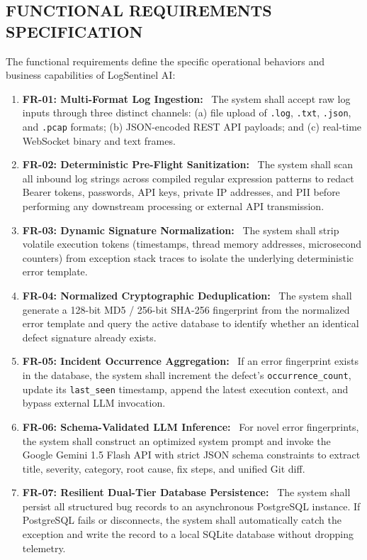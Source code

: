 \documentclass[12pt,a4paper]{article}
\newcommand{\lead}[1]{\textbf{#1}\ }
\begin{document}
\clearpage
\subsection{FUNCTIONAL REQUIREMENTS SPECIFICATION}
The functional requirements define the specific operational behaviors and business capabilities of LogSentinel AI:

\begin{enumerate}[leftmargin=1.5em,itemsep=6pt]
    \item \lead{FR-01: Multi-Format Log Ingestion:} The system shall accept raw log inputs through three distinct channels: (a) file upload of \texttt{.log}, \texttt{.txt}, \texttt{.json}, and \texttt{.pcap} formats; (b) JSON-encoded REST API payloads; and (c) real-time WebSocket binary and text frames.
    \item \lead{FR-02: Deterministic Pre-Flight Sanitization:} The system shall scan all inbound log strings across compiled regular expression patterns to redact Bearer tokens, passwords, API keys, private IP addresses, and PII before performing any downstream processing or external API transmission.
    \item \lead{FR-03: Dynamic Signature Normalization:} The system shall strip volatile execution tokens (timestamps, thread memory addresses, microsecond counters) from exception stack traces to isolate the underlying deterministic error template.
    \item \lead{FR-04: Normalized Cryptographic Deduplication:} The system shall generate a 128-bit MD5 / 256-bit SHA-256 fingerprint from the normalized error template and query the active database to identify whether an identical defect signature already exists.
    \item \lead{FR-05: Incident Occurrence Aggregation:} If an error fingerprint exists in the database, the system shall increment the defect's \texttt{occurrence\_count}, update its \texttt{last\_seen} timestamp, append the latest execution context, and bypass external LLM invocation.
    \item \lead{FR-06: Schema-Validated LLM Inference:} For novel error fingerprints, the system shall construct an optimized system prompt and invoke the Google Gemini 1.5 Flash API with strict JSON schema constraints to extract title, severity, category, root cause, fix steps, and unified Git diff.
    \item \lead{FR-07: Resilient Dual-Tier Database Persistence:} The system shall persist all structured bug records to an asynchronous PostgreSQL instance. If PostgreSQL fails or disconnects, the system shall automatically catch the exception and write the record to a local SQLite database without dropping telemetry.

\end{enumerate}
\end{document}
